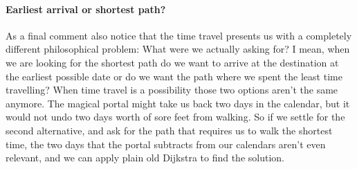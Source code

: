 \paragraph{Earliest arrival or shortest path?}As a final comment also notice that the time travel presents us with a completely different philosophical problem: What were we actually asking for? I mean, when we are looking for the shortest path do we want to arrive at the destination at the earliest possible date or do we want the path where we spent the least time travelling? When time travel is a possibility those two options aren't the same anymore. The magical portal might take us back two days in the calendar, but it would not undo two days worth of sore feet from walking. So if we settle for the second alternative, and ask for the path that requires us to walk the shortest time, the two days that the portal subtracts from our calendars aren't even relevant, and we can apply plain old Dijkstra to find the solution.  
